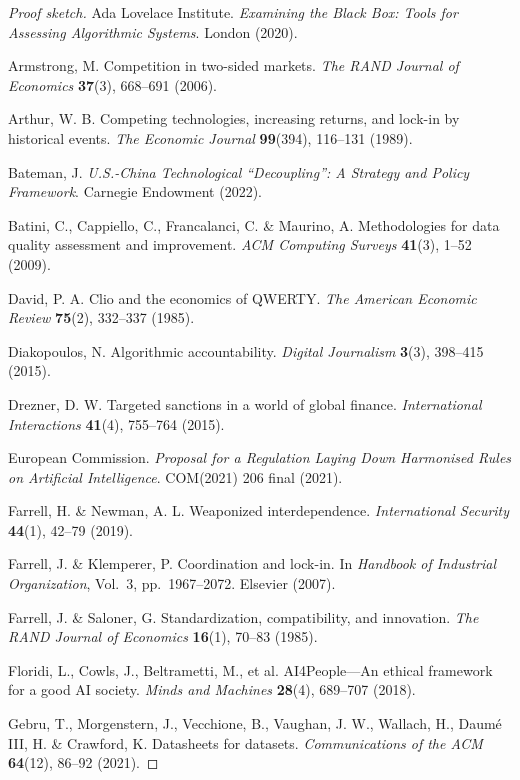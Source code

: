 \documentclass[12pt,a4paper]{ctexart}
\theoremstyle{definition}
\theoremstyle{remark}
\begin{document}
\begin{proof}[Proof sketch]
 Ada Lovelace Institute. \textit{Examining the Black Box: Tools for Assessing Algorithmic Systems}. London (2020).

 Armstrong, M. Competition in two-sided markets. \textit{The RAND Journal of Economics} \textbf{37}(3), 668--691 (2006).

 Arthur, W. B. Competing technologies, increasing returns, and lock-in by historical events. \textit{The Economic Journal} \textbf{99}(394), 116--131 (1989).

 Bateman, J. \textit{U.S.-China Technological ``Decoupling'': A Strategy and Policy Framework}. Carnegie Endowment (2022).

 Batini, C., Cappiello, C., Francalanci, C. \& Maurino, A. Methodologies for data quality assessment and improvement. \textit{ACM Computing Surveys} \textbf{41}(3), 1--52 (2009).

 David, P. A. Clio and the economics of QWERTY. \textit{The American Economic Review} \textbf{75}(2), 332--337 (1985).

 Diakopoulos, N. Algorithmic accountability. \textit{Digital Journalism} \textbf{3}(3), 398--415 (2015).

 Drezner, D. W. Targeted sanctions in a world of global finance. \textit{International Interactions} \textbf{41}(4), 755--764 (2015).

 European Commission. \textit{Proposal for a Regulation Laying Down Harmonised Rules on Artificial Intelligence}. COM(2021) 206 final (2021).

 Farrell, H. \& Newman, A. L. Weaponized interdependence. \textit{International Security} \textbf{44}(1), 42--79 (2019).

 Farrell, J. \& Klemperer, P. Coordination and lock-in. In \textit{Handbook of Industrial Organization}, Vol.~3, pp.~1967--2072. Elsevier (2007).

 Farrell, J. \& Saloner, G. Standardization, compatibility, and innovation. \textit{The RAND Journal of Economics} \textbf{16}(1), 70--83 (1985).

 Floridi, L., Cowls, J., Beltrametti, M., et al. AI4People---An ethical framework for a good AI society. \textit{Minds and Machines} \textbf{28}(4), 689--707 (2018).

 Gebru, T., Morgenstern, J., Vecchione, B., Vaughan, J. W., Wallach, H., Daum\'e III, H. \& Crawford, K. Datasheets for datasets. \textit{Communications of the ACM} \textbf{64}(12), 86--92 (2021).


\end{proof}
\end{document}
